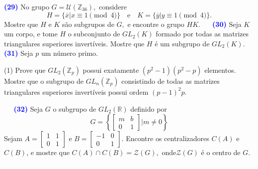 \documentclass[12pt, a4paper]{article}
\newcommand{\negrito}[1]{\mbox{\boldmath{$#1$}}}
\begin{document}
\textcolor{blue}{\bf(29)}\label{ex7} No grupo $G = \mathcal{U}(\mathbb{Z}_{36}),$ considere
\[
H = \{ \overline{x} | x \equiv 1\pmod{4} \} \quad \mbox{e} \quad K = \{ \overline{y} | y \equiv 1\pmod{4} \}.
\]
Mostre que $H$ e $K$ são subgrupos de $G,$ e encontre o grupo $HK.$
\textcolor{white}{Oi}\newline\newline
\textcolor{blue}{\bf(30)}\label{ex8} Seja $K$ um corpo, e tome $H$ o subconjunto de $GL_2(K)$ formado por todas as matrizes triangulares superiores invertíveis. Mostre que $H$ é um subgrupo de $GL_2(K).$
\textcolor{white}{Oi}\newline\newline
\textcolor{blue}{\bf(31)}\label{ex8} Seja $p$ um número primo.
\begin{tasks}[counter-format={(tsk[a])},label-width=3.6ex, label-format = {\bfseries}, column-sep = {0pt}](1)
\task[\textcolor{Floresta}{$\negrito{(a)} $}] Prove que $GL_2(\mathbb{Z}_p)$ possui exatamente $(p^2 - 1)(p^2 - p)$ elementos.
\task[\textcolor{Floresta}{$\negrito{(b)} $}] Mostre que o subgrupo de $GL_n(\mathbb{Z}_p)$ consistindo de todas as matrizes triangulares superiores invertíveis possui ordem $(p - 1)^2p.$
\end{tasks}
\textcolor{white}{Oi}\newline\newline
\textcolor{blue}{\bf(32)}\label{ex9} Seja $G$ o subgrupo de $GL_2(\mathbb{R})$ definido por
\[
G = \left\{ \left[ \begin{array}{cc} m & b \\ 0 & 1 \end{array}   \right] \big|  m \neq 0 \right\}
\]
Sejam $A = \left[ \begin{array}{cc} 1 & 1 \\ 0 & 1 \end{array} \right]$ e $B = \left[ \begin{array}{cc} -1 & 0 \\ 0 & 1 \end{array} \right].$ Encontre os centralizadores $C(A)$ e $C(B)$, e mostre que $C(A) \cap C(B) = \mathcal{Z}(G),$ onde$\mathcal{Z}(G)$ é o centro de $G.$
\textcolor{white}{Oi}\newline\newline
\end{document}
